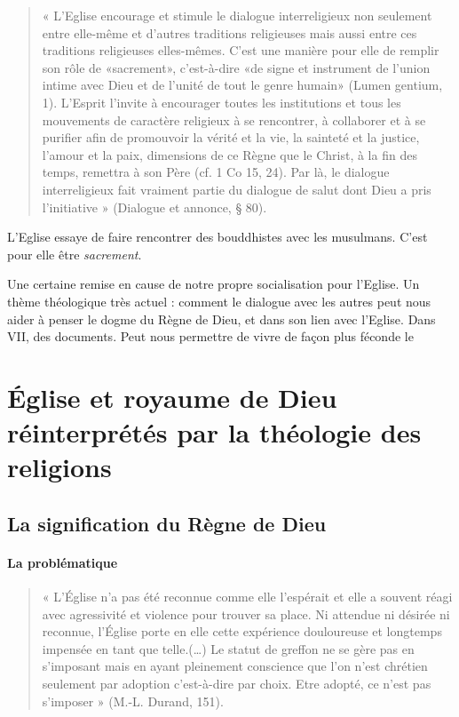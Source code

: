 \begin{quote}
« L’Eglise encourage et stimule le dialogue interreligieux non seulement entre elle-même et d’autres traditions religieuses mais aussi entre ces traditions religieuses elles-mêmes. C’est une manière pour elle de remplir son rôle de «sacrement», c’est-à-dire «de signe et instrument de l’union intime avec Dieu et de l’unité de tout le genre humain» (Lumen gentium, 1). L’Esprit l’invite à encourager toutes les institutions et tous les mouvements de caractère religieux à se rencontrer, à collaborer et à se purifier afin de promouvoir la vérité et la vie, la sainteté et la justice, l’amour et la paix, dimensions de ce Règne que le Christ, à la fin des temps, remettra à son Père (cf. 1 Co 15, 24). Par là, le dialogue interreligieux fait vraiment partie du dialogue de salut dont Dieu a pris l’initiative » (Dialogue et annonce, § 80). 
\end{quote}
L'Eglise essaye de faire rencontrer des bouddhistes avec les musulmans. C'est pour elle être \textit{sacrement}. 


Une certaine remise en cause de notre propre socialisation pour l'Eglise. 
Un thème théologique très actuel : comment le dialogue avec les autres peut nous aider à penser le dogme du Règne de Dieu, et dans son lien avec l'Eglise.
Dans VII, des documents.
Peut nous permettre de vivre de façon plus féconde le
  
  
  
  
\section{Église et royaume de Dieu réinterprétés par la théologie des religions}
  
  
\subsection{La signification du Règne de Dieu}

\paragraph{La problématique} 


\begin{quote}
    « L’Église n’a pas été reconnue comme elle l’espérait et elle a souvent réagi avec agressivité et violence pour trouver sa place. Ni attendue  ni désirée ni reconnue, l’Église porte en elle cette expérience douloureuse et longtemps impensée en tant que telle.(…) Le  statut de greffon  ne se gère pas en s’imposant mais en ayant pleinement conscience que l’on n’est chrétien seulement par adoption c’est-à-dire par choix. Etre adopté, ce n’est pas s’imposer » (M.-L. Durand, 151). 
\end{quote}

